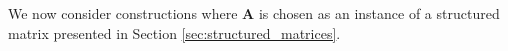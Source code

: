 \documentclass[journal,draftcls,onecolumn]{IEEEtran}
\theoremstyle{mystyle}
\newcommand{\bfD}{\mathbf{D}}
\newcommand{\bfA}{\mathbf{A}}
\newcommand{\bfB}{\mathbf{B}}
\newcommand{\cF}{\mathcal{F}}
\begin{document}
We now consider constructions where $\bfA$ is chosen as an instance of a structured matrix presented in Section \ref{sec:structured_matrices}.
\end{document}
